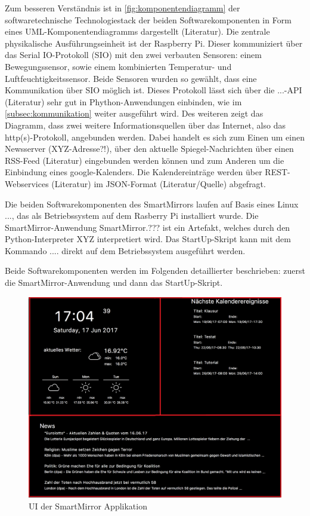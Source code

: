 Zum besseren Verständnis ist in \autoref{fig:komponentendiagramm} der softwaretechnische Technologiestack der beiden Softwarekomponenten in Form eines UML-Komponentendiagramms dargestellt (Literatur). Die zentrale physikalische Ausführungseinheit ist der Raspberry Pi. Dieser kommuniziert über das Serial IO-Protokoll (SIO) mit den zwei verbauten Sensoren: einem Bewegungssensor, sowie einem kombinierten Temperatur- und Luftfeuchtigkeitssensor. Beide Sensoren wurden so gewählt, dass eine Kommunikation über SIO möglich ist. Dieses Protokoll lässt sich über die ...-API (Literatur) sehr gut in Phython-Anwendungen einbinden, wie im \autoref{subsec:kommunikation} weiter ausgeführt wird. Des weiteren zeigt das Diagramm, dass zwei weitere Informationsquellen über das Internet, also das http(s)-Protokoll, angebunden werden. Dabei handelt es sich zum Einen um  
einen Newsserver (XYZ-Adresse?!), über den aktuelle Spiegel-Nachrichten über einen RSS-Feed (Literatur) eingebunden werden können und zum Anderen um die Einbindung eines google-Kalenders. Die Kalendereinträge werden über  REST-Webservices (Literatur) im JSON-Format (Literatur/Quelle) abgefragt. 

Die beiden Softwarekomponenten des SmartMirrors laufen auf Basis eines Linux ..., das als Betriebssystem auf dem Rasberry Pi installiert wurde. Die SmartMirror-Anwendung \glqq SmartMirror.??? \grqq ist ein Artefakt, welches durch den Python-Interpreter \glqq XYZ \grqq interpretiert wird. Das StartUp-Skript kann mit dem Kommando \glqq .... \grqq direkt auf dem Betriebssystem ausgeführt werden. 

Beide Softwarekomponenten werden im Folgenden detaillierter beschrieben: zuerst die SmartMirror-Anwendung und dann das StartUp-Skript.

\begin{figure}
	\centering
	\includegraphics[width=0.7\linewidth]{bilder/grafOberflaeche}
	\caption[UI der SmartMirror Applikation]{UI der SmartMirror Applikation}
	\label{fig:grafoberflaeche}
\end{figure}


